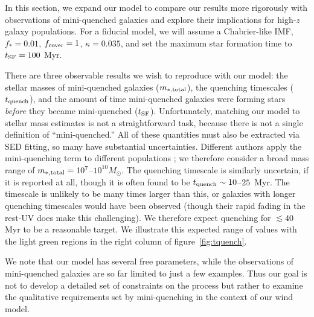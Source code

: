 \documentclass[a4paper,11pt]{article}
\begin{document}
In this section, we expand our model to compare our results more rigorously with observations of mini-quenched galaxies and explore their implications for high-$z$ galaxy populations. For a fiducial model, we will assume a Chabrier-like IMF, $f_{*} = 0.01$, $f_{\rm cover} = 1$, $\kappa = 0.035$, and set the maximum star formation time to $t_{\rm SF} = 100$ Myr.

There are three observable results we wish to reproduce with our model: the stellar masses of mini-quenched galaxies ($m_{*, \rm total}$), the quenching timescales ($t_{\rm quench}$), and the amount of time mini-quenched galaxies were forming stars \textit{before} they became mini-quenched ($t_{\rm SF}$). Unfortunately, matching our model to stellar mass estimates is not a straightforward task, because there is not a single definition of ``mini-quenched.'' All of these quantities must also be extracted via SED fitting, so many have substantial uncertainties. Different authors apply the mini-quenching term to different populations \cite{Dome2024, Covelo-Paz2026, Yang2025}; we therefore consider a broad mass range of $m_{*, \rm total} = 10^{7}$--$10^{10} M_{\odot}$. The quenching timescale is similarly uncertain, if it is reported at all, though it is often found to be $t_{\rm quench} \sim 10$--$25$~Myr. The timescale is unlikely to be many times larger than this, or galaxies with longer quenching timescales would have been observed (though their rapid fading in the rest-UV does make this challenging). We therefore expect quenching for $\lesssim 40$ Myr to be a reasonable target. We illustrate this expected range of values with the light green regions in the right column of figure~\ref{fig:tquench}. 

We note that our model has several free parameters, while the observations of mini-quenched galaxies are so far limited to just a few examples. Thus our goal is not to develop a detailed set of constraints on the process but rather to examine the qualitative requirements set by mini-quenching in the context of our wind model.
\end{document}
